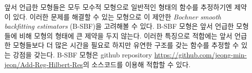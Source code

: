 앞서 언급한 모형들은 모두 모수적 모형으로 일반적인 형태의 함수를 추정하기엔 제약이 있다. 이러한 문제를 해결할 수 있는 모형으로 \citet{jeon2018additive}이 제안한 \textit{Bochner smooth backfitting estimators} (B-SBF)을 고려해볼 수 있다. B-SBF 모형은 앞서 언급한 모형들에 비해 모형의 형태에 큰 제약을 두지 않는다. 이러한 특징으로 적합에는 앞서 언급한 모형들보다 더 많은 시간을 필요로 하지만 유연한 구조를 갖는 함수를 추정할 수 있는 강점을 갖는다. B-SBF 모형은 github repository \url{https://github.com/jeong-min-jeon/Add-Reg-Hilbert-Res}의 소스코드를 이용해 적합할 수 있다.